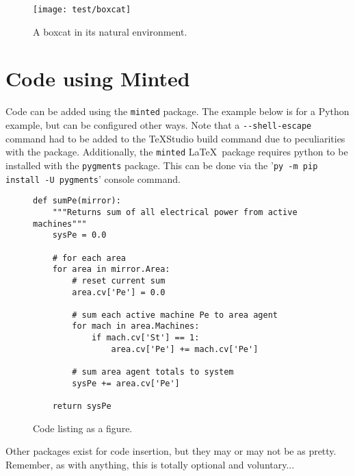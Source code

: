 \begin{figure}[!ht]
	\centering
	\footnotesize
	\texttt{[image: test/boxcat]}
	\caption{A boxcat in its natural environment.}
	\label{fig: boxcat}
\end{figure}\vspace{-1em} %

\section{Code using Minted}
Code can be added using the \verb|minted| package. The example below is for a Python example, but can be configured other ways. Note that a \verb|--shell-escape| command had to be added to the \TeX Studio build command due to peculiarities with the package. 
Additionally, the \verb|minted| \LaTeX\ package requires python to be installed with the \verb|pygments| package.
This can be done via the '\verb|py -m pip install -U pygments|' console command.

\begin{figure}[!ht]
\begin{verbatim}
def sumPe(mirror):
    """Returns sum of all electrical power from active machines"""
    sysPe = 0.0

    # for each area
    for area in mirror.Area:
        # reset current sum
        area.cv['Pe'] = 0.0

        # sum each active machine Pe to area agent
        for mach in area.Machines:
            if mach.cv['St'] == 1:
                area.cv['Pe'] += mach.cv['Pe']

        # sum area agent totals to system
        sysPe += area.cv['Pe']

    return sysPe
\end{verbatim}
	\centering
	\footnotesize
	\caption{Code listing as a figure.}
	\label{fig: codeTest}
\end{figure}\vspace{-1em} %

Other packages exist for code insertion, but they may or may not be as pretty. Remember, as with anything, this is totally optional and voluntary...